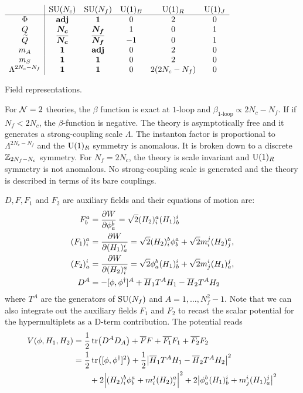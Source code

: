     \begin{table}[H]
        \centering
        $
        \begin{array}{c|ccccc}
            & \text{SU}(N_c) & \text{SU}(N_f) & \text{U}(1)_B & \text{U}(1)_R & \text{U}(1)_J \\ \hline
            \Phi & \textbf{adj} & \boldsymbol{1} & 0 & 2 & 0 \\
            Q & \boldsymbol{N_c} & \boldsymbol{N_f} & 1 & 0 & 1 \\
            \widetilde{Q} & \overline{\boldsymbol{N_c}} & \overline{\boldsymbol{N_f}} & -1 & 0 & 1 \\
            m_A & \boldsymbol{1} & \textbf{adj} & 0 & 2 & 0 \\
            m_S & \boldsymbol{1} & \boldsymbol{1} & 0 & 2 & 0 \\
            \Lambda^{2N_c-N_f} & \boldsymbol{1} & \boldsymbol{1} & 0 & 2(2N_c-N_f) & 0
        \end{array}
        $
        \caption{Field representations.}
        \label{table:fieldrepr}
    \end{table}

    For $\mathcal{N}=2$ theories, the $\beta$ function is exact at $1$-loop and $\beta_{1\text{-loop}}\propto 2N_c-N_f$. If if $N_f<2N_c$, the $\beta$-function is negative. The theory is asymptotically free and it generates a strong-coupling scale $\Lambda$. The instanton factor is proportional to $\Lambda^{2N_c-N_f}$ and the $\text{U}(1)_R$ symmetry is anomalous. It is broken down to a discrete $\mathbb{Z}_{2N_f-N_c}$ symmetry. For $N_f=2N_c$, the theory is scale invariant and $\text{U}(1)_R$ symmetry is not anomalous. No strong-coupling scale is generated and the theory is described in terms of its bare couplings.

    $D,F,F_1$ and $F_2$ are auxiliary fields and their equations of motion are:
    \begin{align}
        F^a_b &= \pdv{W}{\phi^b_a} = \sqrt{2}(H_2)^a_i (H_1)^i_b\\
        (F_1)^a_i &= \pdv{W}{(H_{1})^i_a} = \sqrt{2}(H_2)^b_i\phi^a_b + \sqrt{2}m^j_i(H_2)^a_j,\\
        (F_2)^i_a &= \pdv{W}{(H_{2})^a_i} = \sqrt{2}\phi^b_a (H_1)^i_b + \sqrt{2}m^i_j(H_1)^j_a,\\
        D^A &= -[\phi,\phi^\dagger]^A + \overline{H}_1T^AH_1-\overline{H}_2T^AH_2
    \end{align}
    where $T^A$ are the generators of $\text{SU}(N_f)$ and $A=1,\dots,N^2_f-1$. Note that we can also integrate out the auxiliary fields $F_1$ and $F_2$ to recast the scalar potential for the hypermultiplets as a D-term contribution. The potential reads
    \begin{align}
        V(\phi,H_1,H_2) &= \frac{1}{2}\tr(D^AD_A)+\overline{F}F+\overline{F_1}F_1+\overline{F_2}F_2\\
        &= \frac{1}{2}\tr([\phi,\phi^\dagger]^2)+\frac{1}{2}\abs{\overline{H}_1T^AH_1-\overline{H}_2T^AH_2}^2\\
        &\qquad+2\abs{(H_2)^b_i\phi^a_b+m^j_i(H_2)^a_j}^2+2\abs{\phi^b_a (H_1)^i_b+m^i_j(H_1)^j_a}^2
    \end{align}

